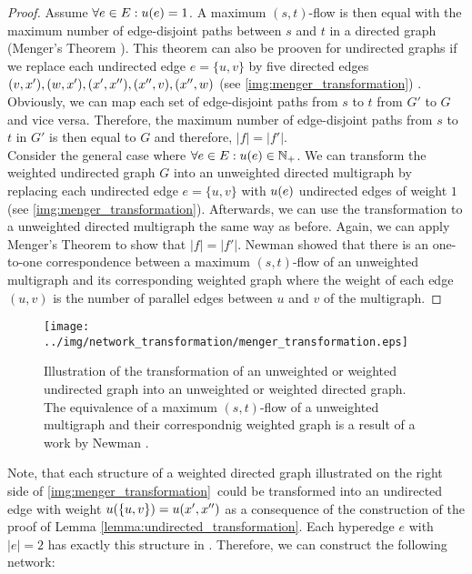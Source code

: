 \begin{proof}
Assume $\forall e \in E: u(e) = 1$. A maximum $(s,t)$-flow is then equal with the maximum
number of edge-disjoint paths between $s$ and $t$ in a directed graph (Menger's Theorem \cite{menger1927allgemeinen}).
This theorem can also be prooven for undirected graphs if we replace each undirected edge
$e = \{u,v\}$ by five directed edges $(v,x'),(w,x'),(x',x''),(x'',v),(x'',w)$ (see \autoref{img:menger_transformation})
\cite{menger1927allgemeinen}. Obviously, we can map each set of edge-disjoint paths from $s$ to $t$ from $G'$ to $G$
and vice versa. Therefore, the maximum number of edge-disjoint paths from $s$ to $t$ in
$G'$ is then equal to $G$ and therefore, $|f| = |f'|$. \\
Consider the general case where $\forall e \in E: u(e) \in \mathbb{N}_+$. We can transform the
weighted undirected graph $G$ into an unweighted directed multigraph by replacing each undirected
edge $e = \{u,v\}$ with $u(e)$ undirected edges of weight $1$ (see \autoref{img:menger_transformation}).
Afterwards, we can use the transformation to a unweighted directed multigraph the same way as before.
Again, we can apply Menger's Theorem to show that $|f| = |f'|$. Newman \cite{newman2004analysis}
showed that there is an one-to-one correspondence between a maximum $(s,t)$-flow of an unweighted multigraph
and its corresponding weighted graph where the weight of each edge $(u,v)$ is the number of parallel
edges between $u$ and $v$ of the multigraph.
\end{proof}

\begin{figure}
\centering
\texttt{[image: ../img/network\_transformation/menger\_transformation.eps]}
\caption{Illustration of the transformation of an unweighted or weighted undirected graph into
         an unweighted or weighted directed graph. The equivalence of a maximum $(s,t)$-flow
         of a unweighted multigraph and their correspondnig weighted graph is a result of 
         a work by Newman \cite{newman2004analysis}.}
\label{img:menger_transformation}
\end{figure}

Note, that each structure of a weighted directed graph illustrated on the right side of
\autoref{img:menger_transformation}~could be transformed into an undirected edge with weight
$u(\{u,v\}) = u(x',x'')$ as a consequence of the construction of the proof of Lemma \ref{lemma:undirected_transformation}.
Each hyperedge $e$ with $|e| = 2$ has exactly this structure in . Therefore, we can 
construct the following network:

